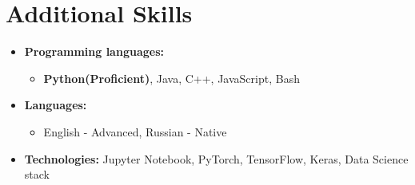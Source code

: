 \documentclass[letterpaper,11pt]{article}
\newcommand{\resumeSubHeadingListStart}{\begin{itemize}[leftmargin=*]}
\newcommand{\resumeSubHeadingListEnd}{\end{itemize}}
\begin{document}
\section{Additional Skills}
 \resumeSubHeadingListStart
    \item \textbf{Programming languages:}{
    \begin{itemize}
    	\item {\textbf{Python(Proficient)}, Java, C++, JavaScript, Bash}
    \end{itemize} 
    }
    \item \textbf{Languages:}{
    \begin{itemize}
    	\item {English - Advanced, Russian - Native}
    \end{itemize}
    }
    
    \item \textbf{Technologies:}{ Jupyter Notebook, PyTorch, TensorFlow, Keras, Data Science stack}

 \resumeSubHeadingListEnd


\end{document}
